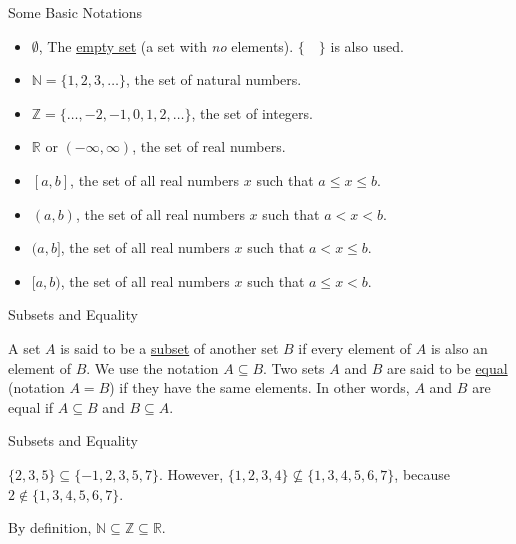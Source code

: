 \begin{frame}{Some Basic Notations}

\begin{itemize}
\item $\emptyset$, The \underline{empty set} (a set with \textit{no} elements). $\{\quad\}$ is also used. 
\item $\mathbb{N}=\{1,2,3,\ldots\}$, the set of natural numbers.
\item $\mathbb{Z}=\{\ldots,-2,-1,0,1,2,\ldots\}$, the set of integers. 
\item $\mathbb{R}$ or $(-\infty,\infty)$, the set of real numbers. 
\item $[a,b]$, the set of all real numbers $x$ such that $a\leq x \leq b$.
\item $(a,b)$, the set of all real numbers $x$ such that $a< x < b$. 
\item $(a,b]$, the set of all real numbers $x$ such that $a< x \leq  b$. 
\item $[a,b)$, the set of all real numbers $x$ such that $a\leq x< b$. 
\end{itemize}

\end{frame}

\begin{frame}{Subsets and Equality}
\begin{definition} A set $A$ is said to be a \underline{subset} of another set $B$  if every element of $A$ is also an element of $B$.  We use the notation $A\subseteq B$.  Two sets $A$ and $B$ are said to be \underline{equal} (notation $A=B$)  if they have the same elements.  In other words, $A$ and $B$ are equal if $A\subseteq B$ and $B\subseteq A$.
\end{definition}
\end{frame}

\begin{frame}{Subsets and Equality}
\begin{example} $\{2,3,5\}\subseteq \{-1,2,3,5,7\}$.  However, $\{1,2,3,4\} \nsubseteq \{1,3,4,5,6,7\}$,  because $2\notin \{1,3,4,5,6,7\}$.
\end{example}

\begin{example} By definition, $\mathbb{N}\subseteq \mathbb{Z}\subseteq \mathbb{R}$.
\end{example}
\end{frame}

